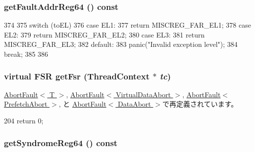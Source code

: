 {
\subsubsection[{getFaultAddrReg64}]{ getFaultAddrReg64 () const}}
\label{classArmISA_1_1ArmFault_a2d53b5dbdfef7129f082792e84b2a732}



\begin{DoxyCode}
374 {
375     switch (toEL) {
376       case EL1:
377         return MISCREG_FAR_EL1;
378       case EL2:
379         return MISCREG_FAR_EL2;
380       case EL3:
381         return MISCREG_FAR_EL3;
382       default:
383         panic("Invalid exception level");
384         break;
385     }
386 }
\end{DoxyCode}
\hypertarget{classArmISA_1_1ArmFault_a48f7b7354d7dcf9850a65f9f433c4871}{
\subsubsection[{getFsr}]{\setlength{\rightskip}{0pt plus 5cm}virtual FSR getFsr ({\bf ThreadContext} $\ast$ {\em tc})}}
\label{classArmISA_1_1ArmFault_a48f7b7354d7dcf9850a65f9f433c4871}


\hyperlink{classArmISA_1_1AbortFault_abae0f5c90ba0a6f56bc8df45dbd5861b}{AbortFault$<$ T $>$}, \hyperlink{classArmISA_1_1AbortFault_abae0f5c90ba0a6f56bc8df45dbd5861b}{AbortFault$<$ VirtualDataAbort $>$}, \hyperlink{classArmISA_1_1AbortFault_abae0f5c90ba0a6f56bc8df45dbd5861b}{AbortFault$<$ PrefetchAbort $>$}, と \hyperlink{classArmISA_1_1AbortFault_abae0f5c90ba0a6f56bc8df45dbd5861b}{AbortFault$<$ DataAbort $>$}で再定義されています。


\begin{DoxyCode}
204 { return 0; }
\end{DoxyCode}
\hypertarget{classArmISA_1_1ArmFault_afe3b3e62aed4e08eb41a2b458fa78b5f}{
\subsubsection[{getSyndromeReg64}]{ getSyndromeReg64 () const}}
\label{classArmISA_1_1ArmFault_afe3b3e62aed4e08eb41a2b458fa78b5f}



